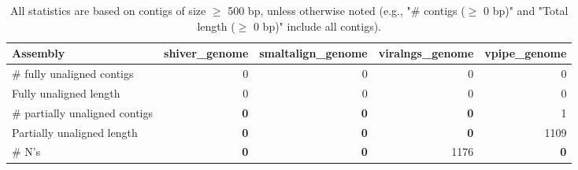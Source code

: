 \documentclass[12pt,a4paper]{article}
\begin{document}
\begin{table}[ht]
\begin{center}
\caption{All statistics are based on contigs of size $\geq$ 500 bp, unless otherwise noted (e.g., "\# contigs ($\geq$ 0 bp)" and "Total length ($\geq$ 0 bp)" include all contigs).}
\begin{tabular}{|l*{4}{|r}|}
\hline
Assembly & shiver\_genome & smaltalign\_genome & viralngs\_genome & vpipe\_genome \\ \hline
\# fully unaligned contigs & 0 & 0 & 0 & 0 \\ \hline
Fully unaligned length & 0 & 0 & 0 & 0 \\ \hline
\# partially unaligned contigs & {\bf 0} & {\bf 0} & {\bf 0} & 1 \\ \hline
Partially unaligned length & {\bf 0} & {\bf 0} & {\bf 0} & 1109 \\ \hline
\# N's & {\bf 0} & {\bf 0} & 1176 & {\bf 0} \\ \hline
\end{tabular}
\end{center}
\end{table}
\end{document}
